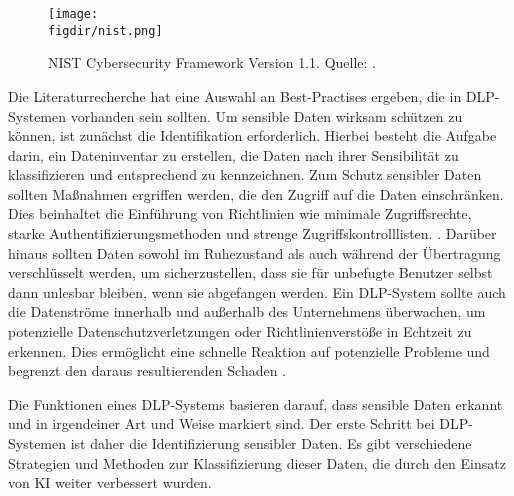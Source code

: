 \begin{figure}[htbp]
    \centering
    \texttt{[image: \\figdir/nist.png]}
    \caption{NIST Cybersecurity Framework Version 1.1. Quelle: \cite{NIST.2014}.}
    \label{f:nist}
\end{figure}

Die Literaturrecherche hat eine Auswahl an Best-Practises ergeben, die in DLP-Systemen vorhanden sein sollten. Um sensible Daten wirksam schützen zu können, ist zunächst die Identifikation erforderlich. Hierbei besteht die Aufgabe darin, ein Dateninventar zu erstellen, die Daten nach ihrer Sensibilität zu klassifizieren und entsprechend zu kennzeichnen. Zum Schutz sensibler Daten sollten Maßnahmen ergriffen werden, die den Zugriff auf die Daten einschränken. Dies beinhaltet die Einführung von Richtlinien wie minimale Zugriffsrechte, starke Authentifizierungsmethoden und strenge Zugriffskontrolllisten. . Darüber hinaus sollten Daten sowohl im Ruhezustand als auch während der Übertragung verschlüsselt werden, um sicherzustellen, dass sie für unbefugte Benutzer selbst dann unlesbar bleiben, wenn sie abgefangen werden. Ein DLP-System sollte auch die Datenströme innerhalb und außerhalb des Unternehmens überwachen, um potenzielle Datenschutzverletzungen oder Richtlinienverstöße in Echtzeit zu erkennen. Dies ermöglicht eine schnelle Reaktion auf potenzielle Probleme und begrenzt den daraus resultierenden Schaden \cite{Hussain.2022}\cite{HerreraMontano.2022}\cite{Shishodia.2022}. %

Die Funktionen eines DLP-Systems basieren darauf, dass sensible Daten erkannt und in irgendeiner Art und Weise markiert sind. Der erste Schritt bei DLP-Systemen ist daher die Identifizierung sensibler Daten. Es gibt verschiedene Strategien und Methoden zur Klassifizierung dieser Daten, die durch den Einsatz von KI weiter verbessert wurden.

